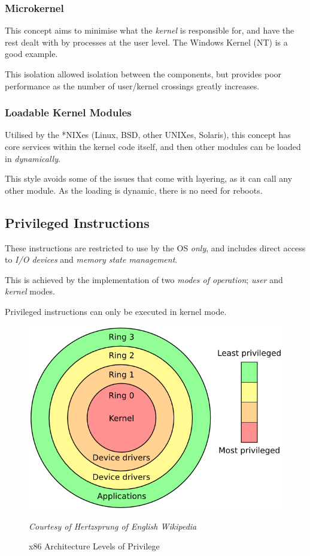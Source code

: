 \documentclass[a4]{article}
\begin{document}
\subsubsection{Microkernel}

This concept aims to minimise what the \textit{kernel} is responsible for, and have the rest dealt with by processes at the user level. The Windows Kernel (NT) is a good example.

This isolation allowed isolation between the components, but provides poor performance as the number of user/kernel crossings greatly increases.

\subsubsection{Loadable Kernel Modules}

Utilised by the *NIXes (Linux, BSD, other UNIXes, Solaris), this concept has core services within the kernel code itself, and then other modules can be loaded in \textit{dynamically}.

This style avoids some of the issues that come with layering, as it can call any other module. As the loading is dynamic, there is no need for reboots.



\filbreak
\subsection{Privileged Instructions}

These instructions are restricted to use by the OS \textit{only}, and includes direct access to \textit{I/O devices} and \textit{memory state management}.

This is achieved by the implementation of two \textit{modes of operation}; \textit{user} and \textit{kernel} modes.

Privileged instructions can only be executed in kernel mode.

\begin{figure}[h!]
  \centering
  \includegraphics[scale=0.35]{privilegeGraphX86}
  \caption{x86 Architecture Levels of Privilege}
  \textit{\footnotesize Courtesy of Hertzsprung of English Wikipedia}
\end{figure}
\end{document}
